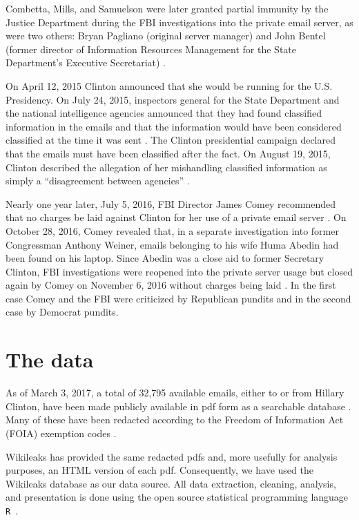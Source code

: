 \documentclass[journal]{vgtc}                %
\begin{document}
Combetta, Mills, and Samuelson were later granted partial immunity by the Justice Department during the FBI investigations into the private email server, as were two others: Bryan Pagliano (original server manager) and  John Bentel (former director of Information Resources Management for the State Department's Executive Secretariat) \cite{immunityPolitico, immunityDailyCaller, immunityIT}.  

On April 12, 2015 Clinton announced that she would be running for the U.S. Presidency.  On July 24, 2015, inspectors general for the State Department  and the national intelligence agencies announced that they had found classified information in the emails and that the information would have been considered classified at the time it was sent \cite{serverClassified}.  The Clinton presidential campaign declared that the emails must have been classified after the fact. On August 19, 2015, Clinton described the allegation of her mishandling classified information as simply a ``disagreement between agencies'' \cite{clintonDenialGuardian}.

Nearly one year later, July 5, 2016,  FBI Director James Comey recommended that no charges be laid against Clinton for her use of a private email server \cite{nochargeFBI}.  On October 28, 2016, Comey revealed that, in a separate investigation into former Congressman Anthony Weiner, emails belonging to his wife Huma Abedin had been found on his laptop.  Since Abedin was a close aid to former Secretary Clinton, FBI investigations were reopened into the private server usage but closed again by Comey on November 6, 2016 without charges being laid \cite{nochargeFBINov}.  In the first case Comey and the FBI were criticized by Republican pundits and in the second case by Democrat pundits. 

\section{The data}
\label{sect:data}
As of March 3, 2017, a total of 32,795 available emails, either to or from Hillary Clinton, have been made publicly available in pdf form as a searchable database \cite{StateDeptFOIA}.  Many of these have been redacted according to the Freedom of Information Act (FOIA) exemption codes \cite{FOIA}.  

Wikileaks \cite{Wikileaks} has provided the same redacted pdfs and, more usefully for analysis purposes, an HTML version of each pdf.  Consequently, we have used the Wikileaks database as our data source.   All data extraction, cleaning, analysis, and presentation is done using the open source statistical programming language \texttt{R}~\cite{Rsystem}.
\end{document}
